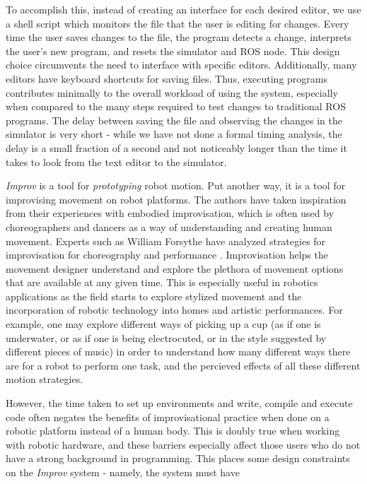 \documentclass[sigchi-a]{acmart}
\begin{document}
\begin{sidebar}
To accomplish this, instead of creating an interface for each desired
editor, we use a shell script which monitors the file that the user is
editing for changes. Every time the user saves changes to the file, the
program detects a change, interprets the user's new program, and resets
the simulator and ROS node. This design choice circumvents the need to
interface with specific editors. Additionally, many editors have
keyboard shortcuts for saving files. Thus, executing programs
contributes minimally to the overall workload of using the system,
especially when compared to the many steps required to test changes to
traditional ROS programs. The delay between saving the file and observing the
changes in the simulator is very short - while we have not done a formal timing
analysis, the delay is a small fraction of a second and not noticeably longer than the
time it takes to look from the text editor to the simulator.

\end{sidebar}

\emph{Improv} is a tool for \emph{prototyping} robot motion. Put another way, it
is a tool for improvising movement on robot platforms. The authors have taken
inspiration from their experiences with embodied improvisation, which is often
used by choreographers and dancers as a way of understanding and creating human
movement. Experts such as William Forsythe have analyzed strategies for
improvisation for choreography and performance \cite{forsythe2004improvisation}.
Improvisation helps the movement designer understand and explore the plethora of
movement options that are available at any given time. This is especially useful
in robotics applications as the field starts to explore stylized movement and
the incorporation of robotic technology into homes and artistic performances. For
example, one may explore different ways of picking up a cup (as if one is
underwater, or as if one is being electrocuted, or in the style suggested by
different pieces of music) in order to understand how many different ways there
are for a robot to perform one task, and the percieved effects of all these
different motion strategies.


However, the time taken to set up environments and write, compile and
execute code often negates the benefits of improvisational practice when done
on a robotic platform instead of a human body. This is
doubly true when working with robotic hardware, and these barriers especially
affect those users who do not have a strong background in programming. This places
some design constraints on the \emph{Improv} system - namely, the system must
have
\end{document}
